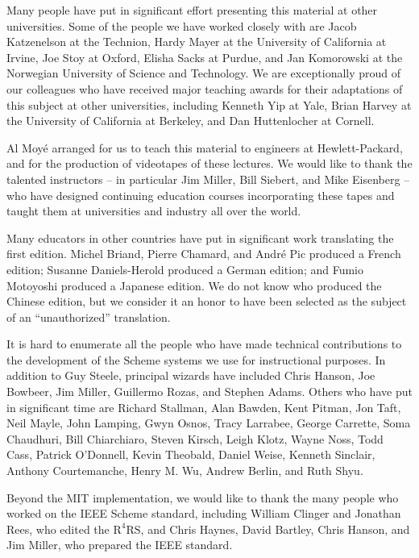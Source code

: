 Many people have put in significant effort presenting this material at
other universities.  Some of the people we have worked closely with
are Jacob Katzenelson at the Technion, Hardy Mayer at the University
of California at Irvine, Joe Stoy at Oxford, Elisha Sacks at Purdue,
and Jan Komorowski at the Norwegian University of Science and
Technology.  We are exceptionally proud of our colleagues who have
received major teaching awards for their adaptations of this subject
at other universities, including Kenneth Yip at Yale, Brian Harvey at
the University of California at Berkeley, and Dan Huttenlocher at
Cornell.

Al Moy\'e arranged for us to teach this material to engineers at
Hewlett-Packard, and for the production of videotapes of these
lectures.
We would like to thank the talented instructors -- in
particular Jim Miller, Bill Siebert, and Mike Eisenberg -- who have
designed continuing education courses incorporating these tapes and
taught them at universities and industry all over the world.

Many educators in other countries have put in significant
work translating the first edition.
Michel Briand, Pierre Chamard, and Andr\'e Pic produced a French edition;
Susanne Daniels-Herold produced a German
edition; and Fumio Motoyoshi produced a Japanese edition.
We do not know who produced the Chinese edition,
but we consider it an honor to have been selected as the
subject of an ``unauthorized'' translation.

It is hard to enumerate all the people who have made technical
contributions to the development of the Scheme systems we use for
instructional purposes.  In addition to Guy Steele, principal wizards
have included Chris Hanson, Joe Bowbeer, Jim Miller, Guillermo Rozas,
and Stephen Adams.  Others who have put in significant time are
Richard Stallman, Alan Bawden, Kent Pitman, Jon Taft, Neil Mayle, John
Lamping, Gwyn Osnos, Tracy Larrabee, George Carrette, Soma
Chaudhuri, Bill Chiarchiaro, Steven Kirsch, Leigh Klotz, Wayne Noss,
Todd Cass, Patrick O'Donnell, Kevin Theobald, Daniel Weise, Kenneth
Sinclair, Anthony Courtemanche, Henry M. Wu, Andrew Berlin, and Ruth
Shyu.

Beyond the MIT implementation, we would like to thank the many people
who worked on the IEEE Scheme standard, including William Clinger and
Jonathan Rees, who edited the $\mathrm{R^4RS}$, and Chris Haynes, David
Bartley, Chris Hanson, and Jim Miller, who prepared the IEEE standard.

